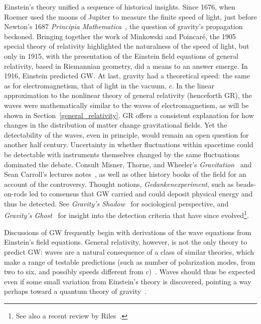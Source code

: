         Einstein's theory unified a sequence of historical insights. 
Since 1676, when Roemer used the moons of Jupiter to measure the finite speed of light, just before Newton's 1687 \textit{Principia Mathematica}~\cite{Hawking2002}, the question of gravity's propagation beckoned. 
Bringing together the work of Minkowski and Poincar\'{e}, the 1905 special theory of relativity highlighted the naturalness of the speed of light, but only in 1915, with the presentation of the Einstein field equations of general relativity, based in Riemannian geometry, did a means to an answer emerge. 
In 1916, Einstein predicted GW. 
At last, gravity had a theoretical speed: the same as for electromagnetism, that of light in the vacuum, $c$.
In the linear approximation to the nonlinear theory of general relativity (henceforth GR), the waves were mathematically similar to the waves of electromagnetism, as will be shown in Section~\ref{general_relativity}.
GR offers a consistent explanation for how changes in the distribution of matter change gravitational fields.
Yet the detectability of the waves, even in principle, would remain an open question for another half century. 
Uncertainty in whether fluctuations within spacetime could be detectable with instruments themselves changed by the same fluctuations dominated the debate. %
Consult Misner, Thorne, and Wheeler's \textit{Gravitation}~\cite{MisnerThorneWheeler} and Sean Carroll's lectures notes~\cite{Carroll1997}, as well as other history books of the field for an account of the controversy.
Thought notions, \textit{Gedankenexperiment}, such as beads-on-rods led to consensus that GW carried and could deposit physical energy and thus be detected. 
See \textit{Gravity's Shadow}~\cite{CollinsGravityShadow} for sociological perspective, and 
\textit{Gravity's Ghost}~\cite{CollinsGravityGhost} for insight into the detection criteria that have since evolved\footnote{See also a recent review by Riles~\cite{Riles2013}.}.

Discussions of GW frequently begin with derivations of the wave equations from Einstein's field equations. 
General relativity, however, is not the only theory to predict GW: waves are a natural consequence of a class of similar theories, which make a range of testable predictions (such as number of polarization modes, from two to six, and possibly speeds different from $c$)~\cite{Will1993}. 
Waves should thus be expected even if some small variation from Einstein's theory is discovered, pointing a way perhaps toward a quantum theory of gravity~\cite{Sathyaprakash2009}. 

